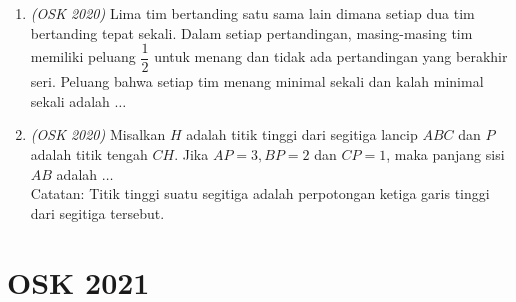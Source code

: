 \documentclass[11pt]{scrartcl}
\begin{document}
\begin{enumerate}
    \item \textit{(OSK 2020)} Lima tim bertanding satu sama lain dimana setiap dua tim bertanding tepat sekali. Dalam setiap pertandingan, masing-masing tim memiliki peluang $\dfrac{1}{2}$ untuk menang dan tidak ada pertandingan yang berakhir seri. Peluang  bahwa setiap tim menang minimal sekali dan kalah minimal sekali adalah $\dots$
    
    \item \textit{(OSK 2020)} Misalkan $H$ adalah titik tinggi dari segitiga lancip $ABC$ dan $P$ adalah titik tengah $CH$. Jika $AP = 3, BP = 2$ dan $CP = 1$, maka panjang sisi $AB$ adalah $\dots$
    \\
    Catatan: Titik tinggi suatu segitiga adalah perpotongan ketiga garis tinggi dari segitiga tersebut.
\end{enumerate}
\newpage
\section{OSK 2021}
\end{document}
